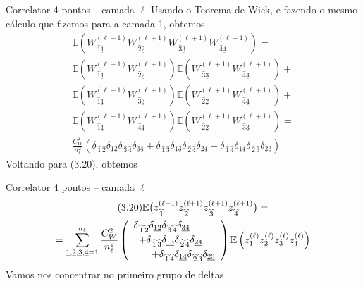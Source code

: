 \documentclass{beamer}
\newcommand{\EE}{\mathbb{E}}
\def\mi#1{{\,\widehat{#1}}}
\def\mj#1{\underline{#1}}
\def\eell{{(\ell)}}
\def\eellum{{(\ell+1)}}
\begin{document}
\begin{frame}{Correlator 4 pontos -- camada $\ell$}
	Usando o Teorema de Wick, e fazendo o mesmo cálculo que fizemos para a camada 1, obtemos
	\begin{multline*}
		\EE\left(W^\eellum_{\mi1\mj1}W^\eellum_{\mi2\mj2}W^\eellum_{\mi3\mj3}W^\eellum_{\mi4\mj4} \right) = \\
		\EE\left(W^\eellum_{\mi1\mj1}W^\eellum_{\mi2\mj2}\right)\EE\left(W^\eellum_{\mi3\mj3}W^\eellum_{\mi4\mj4}\right) + \\
		\EE\left(W^\eellum_{\mi1\mj1}W^\eellum_{\mi3\mj3}\right)\EE\left(W^\eellum_{\mi2\mj2}W^\eellum_{\mi4\mj4}\right) + \\
		\EE\left(W^\eellum_{\mi1\mj1}W^\eellum_{\mi4\mj4}\right)\EE\left(W^\eellum_{\mi2\mj2}W^\eellum_{\mi3\mj3}\right) = \\
		\frac{C_W^2}{n_\ell^2}\left(\delta_{\mi1\mi2}\delta_{\mj1\mj2}\delta_{\mi3\mi4}\delta_{\mj3\mj4} + \delta_{\mi1\mi3}\delta_{\mj1\mj3} \delta_{\mi2\mi4}\delta_{\mj2\mj4} + \delta_{\mi1\mi4}\delta_{\mj1\mj4} \delta_{\mi2\mi3}\delta_{\mj2\mj3}\right)
	\end{multline*}
	Voltando para (3.20), obtemos
\end{frame}

\begin{frame}{Correlator 4 pontos -- camada $\ell$}
	\begin{multline*}\tag{3.20}\EE\big(z^\eellum_{\mi1} z^\eellum_{\mi2} z^\eellum_{\mi3} z^\eellum_{\mi4}\big) = \\
		= \sum_{\mj1,\mj2,\mj3,\mj4=1}^{n_\ell}\frac{C_W^2}{n_\ell^2}\left(\begin{array}{r}
			\delta_{\mi1\mi2}\delta_{\mj1\mj2}\delta_{\mi3\mi4}\delta_{\mj3\mj4} \hspace{6ex} \\[1mm] 
			+\delta_{\mi1\mi3}\delta_{\mj1\mj3} \delta_{\mi2\mi4}\delta_{\mj2\mj4} \hspace{3ex} \\[1mm]
			+  \delta_{\mi1\mi4}\delta_{\mj1\mj4} \delta_{\mi2\mi3}\delta_{\mj2\mj3}
		\end{array}\right)\EE\left( z^\eell_{\mj1}z^\eell_{\mj2}z^\eell_{\mj3}z^\eell_{\mj4}\right)
	\end{multline*}
	Vamos nos concentrar no  primeiro grupo de deltas
\end{frame}
\end{document}
